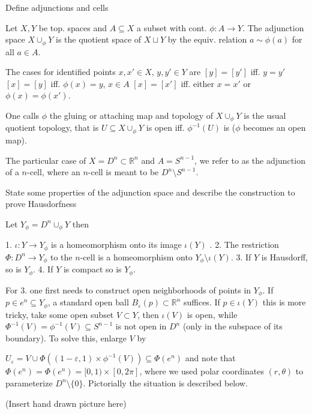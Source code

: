 Define adjunctions and cells

Let \( X, Y \) be top. spaces and \( A \subseteq X \) a subset with cont. \( \phi : A \to Y \).
The adjunction space \( X \cup_{\phi} Y\) is the quotient space of \( X \sqcup Y \) by the equiv. relation \( a \sim \phi(a) \)
for all \( a \in A \).

The cases for identified points \( x, x' \in X \), \( y, y' \in Y \)
are
\( [y] = [y'] \) iff. \( y = y' \)
\( [x] = [y] \) iff. \( \phi(x) = y \), \( x \in A \)
\( [x] = [x'] \) iff. either \( x = x' \) or \( \phi(x) = \phi(x') \).

One calls \( \phi \) the gluing or attaching map and topology of \( X \cup_{\phi} Y \) is the usual quotient topology,
that is \( U \subseteq X \cup_{\phi} Y \) is open iff. \( \phi^{-1}(U) \) is (\( \phi \) becomes an open map).

The particular case of \( X = D^n \subset \mathbb{R}^n \) and \( A = S^{n-1} \), we refer to as the adjunction of a \( n \)-cell,
where an \( n \)-cell is meant to be \( D^n \setminus S^{n-1} \).


State some properties of the adjunction space and describe the construction to prove Hausdorfness

Let \( Y_\phi = D^n \cup_\phi Y \) then

1. \( \iota : Y \to Y_\phi \) is a homeomorphism onto its image \( \iota(Y) \) .
2. The restriction \( \Phi : D^n \to Y_{\phi} \) to the \( n \)-cell is a homeomorphism onto \( Y_\phi \setminus \iota(Y) \).
3. If \( Y \) is Hausdorff, so is \( Y_\phi \).
4. If \( Y \) is compact so is \( Y_\phi \).

For 3. one first needs to construct open neighborhoods of points in \( Y_\phi \).
If \( p \in e^n \subseteq Y_\phi \), a standard open ball \( B_\varepsilon(p) \subset \mathbb{R}^n \) suffices.
If \( p \in \iota(Y) \) this is more tricky, take some open subset \( V \subset Y \), then \( \iota(V) \) is open,
while \( \Phi^{-1}(V) = \phi^{-1}(V) \subseteq S^{n-1} \) is not open in \( D^n \) (only in the subspace of its boundary).
To solve this, enlarge \( V \) by

\( U_{\varepsilon} = V \cup \Phi((1 - \varepsilon, 1) \times \phi^{-1}(V)) \subseteq \Phi(e^n) \)
and note that \( \Phi(e^n) = \Phi(e^n) = [0, 1) \times [0, 2\pi]\),
where we used polar coordinates \( (r, \theta) \) to parameterize \( D^n \setminus \{0\} \).
Pictorially the situation is described below.

(Insert hand drawn picture here)


